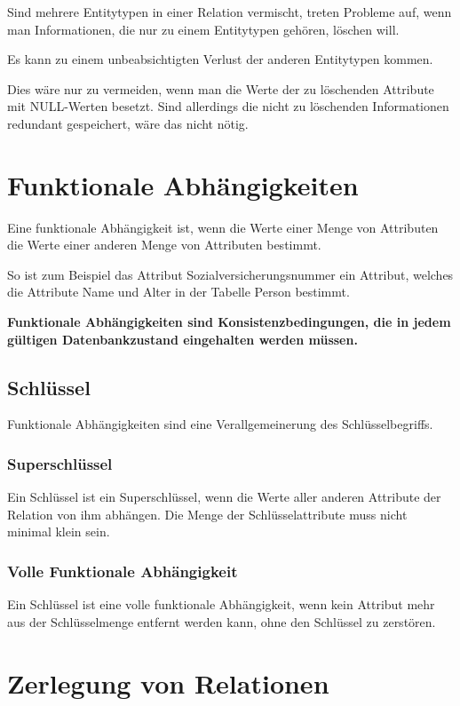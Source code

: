 Sind mehrere Entitytypen in einer Relation vermischt, treten Probleme auf, wenn man Informationen, die nur zu einem Entitytypen gehören, löschen will.

Es kann zu einem unbeabsichtigten Verlust der anderen Entitytypen kommen.

Dies wäre nur zu vermeiden, wenn man die Werte der zu löschenden Attribute mit NULL-Werten besetzt. Sind allerdings die nicht zu löschenden Informationen redundant gespeichert, wäre das nicht nötig.

\section{Funktionale Abhängigkeiten}

Eine funktionale Abhängigkeit ist, wenn die Werte einer Menge von Attributen die Werte einer anderen Menge von Attributen bestimmt.

So ist zum Beispiel das Attribut Sozialversicherungsnummer ein Attribut, welches die Attribute Name und Alter in der Tabelle Person bestimmt.

\textbf{Funktionale Abhängigkeiten sind Konsistenzbedingungen, die in jedem gültigen Datenbankzustand eingehalten werden müssen.}

\subsection{Schlüssel}

Funktionale Abhängigkeiten sind eine Verallgemeinerung des Schlüsselbegriffs.

\subsubsection{Superschlüssel}

Ein Schlüssel ist ein Superschlüssel, wenn die Werte aller anderen Attribute der Relation von ihm abhängen. Die Menge der Schlüsselattribute muss nicht minimal klein sein.

\subsubsection{Volle Funktionale Abhängigkeit}

Ein Schlüssel ist eine volle funktionale Abhängigkeit, wenn kein Attribut mehr aus der Schlüsselmenge entfernt werden kann, ohne den Schlüssel zu zerstören.

\section{Zerlegung von Relationen}

